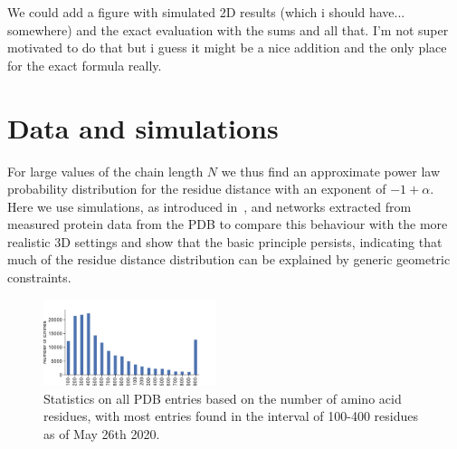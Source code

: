 \documentclass[
reprint,
twocolumn,
amsmath,amssymb,superscriptaddress,aps,
pre]{revtex4-1}
\newcommand{\red}[1]{\textcolor{red!80!black}{#1}}
\newcommand{\blue}[1]{\textcolor{blue!80!black}{#1}}
\begin{document}


\red{We could add a figure with simulated 2D results (which i should have... somewhere) and the exact evaluation with the sums and all that. I'm not super motivated to do that but i guess it might be a nice addition and the only place for the exact formula really.}

\section*{Data and simulations}
For large values of the chain length $N$ we thus find an approximate power law probability distribution for the residue distance with an exponent of $-1+\alpha$. Here we use simulations, as introduced in~\cite{molkenthin2020self}, and networks extracted from measured protein data from the PDB \cite{PDB} to compare this behaviour with the more realistic 3D settings and show that the basic principle persists, indicating that much of the residue distance distribution can be explained by generic geometric constraints.
 \begin{figure}[h]
        \centering
    \includegraphics[width=0.45\textwidth]{paper/figures/Fig2/pdb_statistics.pdf}
        \caption{Statistics on all PDB entries based on the number of amino acid residues, with most entries found in the interval of 100-400 residues as of May 26th 2020.}
        \label{fig:pdb_stats}
\end{figure}
\end{document}
